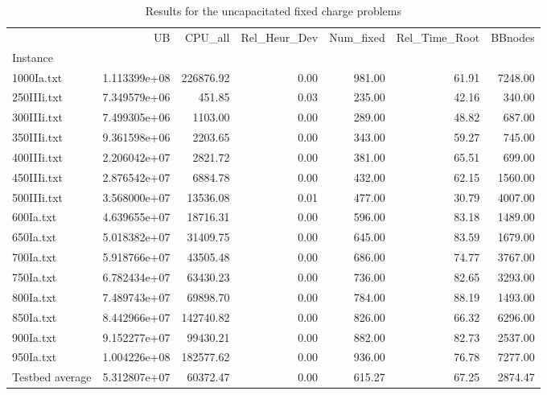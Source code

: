 \begin{table}
\centering
\caption{Results for the uncapacitated fixed charge problems}
\begin{tabular}{lrrrrrr}
\toprule
{} &            UB &    CPU\_all &  Rel\_Heur\_Dev &  Num\_fixed &  Rel\_Time\_Root &  BBnodes \\
Instance        &               &            &               &            &                &          \\
\midrule
1000Ia.txt      &  1.113399e+08 &  226876.92 &          0.00 &     981.00 &          61.91 &  7248.00 \\
250IIIi.txt     &  7.349579e+06 &     451.85 &          0.03 &     235.00 &          42.16 &   340.00 \\
300IIIi.txt     &  7.499305e+06 &    1103.00 &          0.00 &     289.00 &          48.82 &   687.00 \\
350IIIi.txt     &  9.361598e+06 &    2203.65 &          0.00 &     343.00 &          59.27 &   745.00 \\
400IIIi.txt     &  2.206042e+07 &    2821.72 &          0.00 &     381.00 &          65.51 &   699.00 \\
450IIIi.txt     &  2.876542e+07 &    6884.78 &          0.00 &     432.00 &          62.15 &  1560.00 \\
500IIIi.txt     &  3.568000e+07 &   13536.08 &          0.01 &     477.00 &          30.79 &  4007.00 \\
600Ia.txt       &  4.639655e+07 &   18716.31 &          0.00 &     596.00 &          83.18 &  1489.00 \\
650Ia.txt       &  5.018382e+07 &   31409.75 &          0.00 &     645.00 &          83.59 &  1679.00 \\
700Ia.txt       &  5.918766e+07 &   43505.48 &          0.00 &     686.00 &          74.77 &  3767.00 \\
750Ia.txt       &  6.782434e+07 &   63430.23 &          0.00 &     736.00 &          82.65 &  3293.00 \\
800Ia.txt       &  7.489743e+07 &   69898.70 &          0.00 &     784.00 &          88.19 &  1493.00 \\
850Ia.txt       &  8.442966e+07 &  142740.82 &          0.00 &     826.00 &          66.32 &  6296.00 \\
900Ia.txt       &  9.152277e+07 &   99430.21 &          0.00 &     882.00 &          82.73 &  2537.00 \\
950Ia.txt       &  1.004226e+08 &  182577.62 &          0.00 &     936.00 &          76.78 &  7277.00 \\
Testbed average &  5.312807e+07 &   60372.47 &          0.00 &     615.27 &          67.25 &  2874.47 \\
\bottomrule
\end{tabular}
\end{table}

